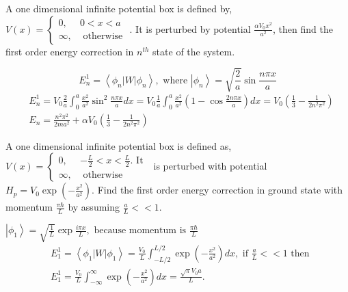  \begin{enumerate}
 		\begin{minipage}{\textwidth}
 		\item A one dimensional infinite potential box is defined by, $V(x)=\left\{\begin{array}{ll}0, & 0<x<a \\ \infty, & \text { otherwise }\end{array}\right.$. It is perturbed by potential $\frac{\alpha V_{0} x^{2}}{a^{2}}$, then find the first order energy correction in $n^{t h}$ state of the system.
 	\end{minipage}
 	\begin{answer}
 	$$E_{n}^{1}=\left\langle\phi_{n}|W| \phi_{n}\right\rangle, \text { where }\left|\phi_{n}\right\rangle=\sqrt{\frac{2}{a}} \sin \frac{n \pi x}{a}$$
 	\begin{align*}
 		&E_{n}^{1}=V_{0} \frac{2}{a} \int_{0}^{a} \frac{x^{2}}{a^{2}} \sin ^{2} \frac{n \pi x}{a} d x=V_{0} \frac{1}{a} \int_{0}^{a} \frac{x^{2}}{a^{2}}\left(1-\cos \frac{2 n \pi x}{a}\right) d x=V_{0}\left(\frac{1}{3}-\frac{1}{2 n^{2} \pi^{2}}\right) \\
 		&E_{n}=\frac{n^{2} \pi^{2}}{2 m a^{2}}+\alpha V_{0}\left(\frac{1}{3}-\frac{1}{2 n^{2} \pi^{2}}\right)
 	\end{align*}	
 	\end{answer}
 	\begin{minipage}{\textwidth}
 	\item A one dimensional infinite potential box is defined as, $V(x)= \begin{cases}0, & -\frac{L}{2}<x<\frac{L}{2} . \text { It } \\ \infty, & \text { otherwise }\end{cases}$ is perturbed with potential $H_{p}=V_{0} \exp \left(-\frac{x^{2}}{a^{2}}\right) .$ Find the first order energy correction in ground state with momentum $\frac{\pi \hbar}{L}$ by assuming $\frac{a}{L}<<1$.
 \end{minipage}
 \begin{answer}
  $\left|\phi_{1}\right\rangle=\sqrt{\frac{1}{L}} \exp \frac{i \pi x}{L}, \text { because momentum is } \frac{\pi \hbar}{L}$\\
  \begin{align*}
  	&E_{1}^{1}=\left\langle\phi_{1}|W| \phi_{1}\right\rangle=\frac{V_{0}}{L} \int_{-L / 2}^{L / 2} \exp \left(-\frac{x^{2}}{a^{2}}\right) d x, \text { if } \frac{a}{L}<<1 \text { then } \\
  	&E_{1}^{1}=\frac{V_{0}}{L} \int_{-\infty}^{\infty} \exp \left(-\frac{x^{2}}{a^{2}}\right) d x=\frac{\sqrt{\pi} V_{0} a}{L} .

\end{align*}
\end{answer}
\end{enumerate}
